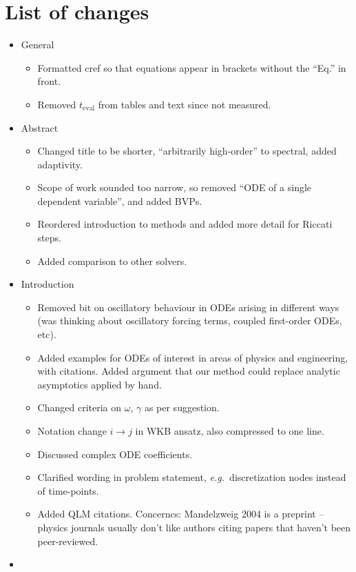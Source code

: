 \documentclass[10pt]{article}
\newcommand{\eg}{{\it e.g.\ }}
\newcommand{\om}{\omega}
\newcommand{\Fruzsi}[1]{{\color{blue}#1}}
\begin{document}
\Fruzsi{
\section{List of changes}

\begin{itemize}
    \item{General
        \begin{itemize}
            \item{Formatted cref so that equations appear in brackets without the ``Eq.'' in front.}
            \item{Removed $t_{\mathrm{eval}}$ from tables and text since not measured.}
        \end{itemize}
    }
    \item{Abstract
        \begin{itemize}
            \item{Changed title to be shorter, ``arbitrarily high-order'' to spectral, added adaptivity.}
            \item{Scope of work sounded too narrow, so removed ``ODE of a single dependent variable'', and added BVPs.}
            \item{Reordered introduction to methods and added more detail for Riccati steps.}
            \item{Added comparison to other solvers.}
        \end{itemize}
    }
    \item{Introduction
        \begin{itemize}
            \item{Removed bit on oscillatory behaviour in ODEs arising in different ways (was thinking about oscillatory forcing terms, coupled first-order ODEs, etc).}
            \item{Added examples for ODEs of interest in areas of physics and engineering, with citations. Added argument that our method could replace analytic asymptotics applied by hand.}
            \item{Changed criteria on $\om$, $\gamma$ as per suggestion.}
            \item{Notation change $i \to j$ in WKB ansatz, also compressed to one line.}
            \item{Discussed complex ODE coefficients.}
            \item{Clarified wording in problem statement, \eg discretization nodes instead of time-points.}
            \item{Added QLM citations. Concerncs: Mandelzweig 2004 is a preprint -- physics journals usually don't like authors citing papers that haven't been peer-reviewed. }

        \end{itemize}
    }

    \item{}
\end{itemize}

}


\end{document}
